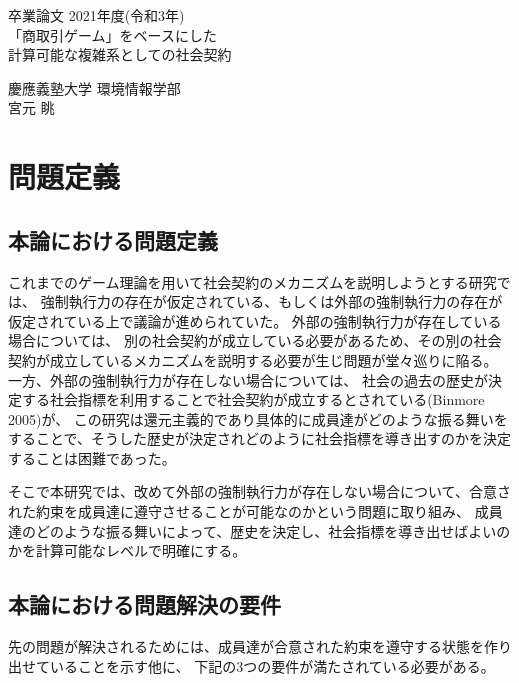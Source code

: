 \documentclass[a4j]{ujreport}
\date{\today}
\def\title{「商取引ゲーム」をベースにした\\計算可能な複雑系としての社会契約}
\def\author{宮元 眺}
\def\dept{慶應義塾大学 環境情報学部}
\begin{document}
\begin{titlepage}
  \begin{center}
    \begin{large}
      卒業論文   2021年度(令和3年)\\
      \vspace{24pt}
      \title
    \end{large}
  \end{center}
  \vspace{40em}
  \begin{flushright}
    \large \dept\\
    \author
  \end{flushright}
\end{titlepage}



\tableofcontents\thispagestyle{plain}



\chapter{問題定義}
\section{本論における問題定義}
これまでのゲーム理論を用いて社会契約のメカニズムを説明しようとする研究では、
強制執行力の存在が仮定されている、もしくは外部の強制執行力の存在が仮定されている上で議論が進められていた。
外部の強制執行力が存在している場合については、
別の社会契約が成立している必要があるため、その別の社会契約が成立しているメカニズムを説明する必要が生じ問題が堂々巡りに陥る。
一方、外部の強制執行力が存在しない場合については、
社会の過去の歴史が決定する社会指標を利用することで社会契約が成立するとされている(Binmore 2005\cite{Binmore 2005})が、
この研究は還元主義的であり具体的に成員達がどのような振る舞いをすることで、そうした歴史が決定されどのように社会指標を導き出すのかを決定することは困難であった。

そこで本研究では、改めて外部の強制執行力が存在しない場合について、合意された約束を成員達に遵守させることが可能なのかという問題に取り組み、
成員達のどのような振る舞いによって、歴史を決定し、社会指標を導き出せばよいのかを計算可能なレベルで明確にする。


\section{本論における問題解決の要件}
先の問題が解決されるためには、成員達が合意された約束を遵守する状態を作り出せていることを示す他に、
下記の3つの要件が満たされている必要がある。
\end{document}
